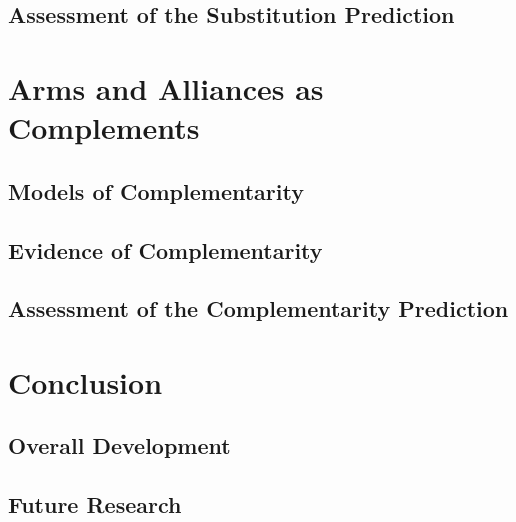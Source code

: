 \documentclass[12pt]{article}
\begin{document}
\subsection{Assessment of the Substitution Prediction}





\section{Arms and Alliances as Complements}




\subsection{Models of Complementarity} 





\subsection{Evidence of Complementarity} 





\subsection{Assessment of the Complementarity Prediction} 






\section{Conclusion}



\subsection{Overall Development}








\subsection{Future Research}
\end{document}
